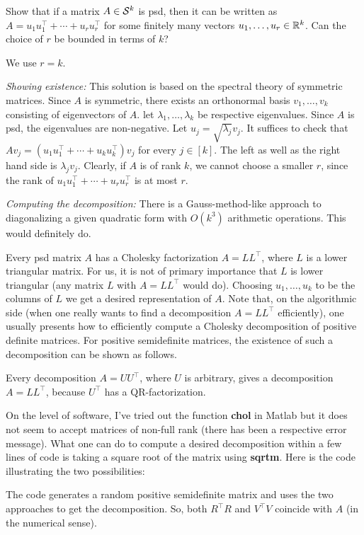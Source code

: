 \begin{exercise}
	\label{sdp:sum:rank:1}
	Show that if a matrix $A \in \mathcal{S}^k$ is psd, then it can be written as $A = u_1 u_1^\top + \cdots + u_r u_r^\top$ for some finitely many vectors $u_1,\ldots,u_r \in \mathbb{R}^k$. Can the choice of $r$ be bounded in terms of $k$?
\end{exercise}
\begin{solution}
	We use $r=k$. 
	
	\emph{Showing existence:} This solution is based on the spectral theory of symmetric matrices. 
	Since $A$ is symmetric, there exists an orthonormal basis $v_1,\ldots,v_k$ consisting of eigenvectors of $A$. let $\lambda_1,\ldots,\lambda_k$ be respective eigenvalues. Since $A$ is psd, the eigenvalues are non-negative. Let $u_j = \sqrt{\lambda_j} v_j$. It suffices to check that $A v_j = (u_1 u_1^\top + \cdots + u_k u_k^\top) v_j$ for every $j\in[k]$. The left as well as the right hand side is $\lambda_j v_j$. Clearly, if $A$ is of rank $k$, we cannot choose a smaller $r$, since the rank of $u_1 u_1^\top + \cdots + u_r u_r^\top$ is at most $r$. 
	
	\emph{Computing the decomposition:} There is a Gauss-method-like approach to diagonalizing a given quadratic form with $O(k^3)$ arithmetic operations. This would definitely do. 
	
	Every psd matrix $A$ has a Cholesky factorization $A = L L^\top$, where $L$ is a lower triangular matrix. For us, it is not of primary importance that $L$ is lower triangular (any matrix $L$ with $A = LL^\top$ would do). 
	Choosing $u_1,\ldots,u_k$ to be the columns of $L$ we get a desired representation of $A$. Note that, on the algorithmic side (when one really wants to find a decomposition $A=L L^\top$ efficiently), one usually presents how to efficiently compute a Cholesky decomposition of positive definite matrices. For positive semidefinite matrices, the existence of such a decomposition can be shown as follows. 
	
	
	Every decomposition $A=UU^\top$, where $U$ is arbitrary, gives a decomposition $A=LL^\top$, because $U^\top$ has a QR-factorization. 
	
	On the level of software, I've tried out the function \textbf{chol} in Matlab but it does not seem to accept matrices of non-full rank (there has been a respective error message). What one can do to compute a desired decomposition within a few lines of code is taking a square root of the matrix using \textbf{sqrtm}. Here is the code illustrating the two possibilities:
	
		
	
	The code generates a random positive semidefinite matrix and uses the two approaches to get the decomposition. So, both $R^\top R$ and $V^\top V$ coincide with $A$ (in the numerical sense). 
\end{solution}

